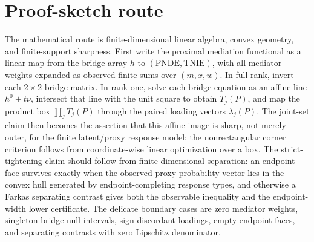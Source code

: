 \documentclass[11pt]{article}
\theoremstyle{definition}
\theoremstyle{plain}
\theoremstyle{remark}
\begin{document}
\section{Proof-sketch route}
The mathematical route is finite-dimensional linear algebra, convex geometry, and finite-support sharpness.  First write the proximal mediation functional as a linear map from the bridge array \(h\) to \((\mathrm{PNDE},\mathrm{TNIE})\), with all mediator weights expanded as observed finite sums over \((m,x,w)\).  In full rank, invert each \(2\times2\) bridge matrix.  In rank one, solve each bridge equation as an affine line \(h^0+t\nu\), intersect that line with the unit square to obtain \(T_j(P)\), and map the product box \(\prod_jT_j(P)\) through the paired loading vectors \(\lambda_j(P)\).  The joint-set claim then becomes the assertion that this affine image is sharp, not merely outer, for the finite latent/proxy response model; the nonrectangular corner criterion follows from coordinate-wise linear optimization over a box.  The strict-tightening claim should follow from finite-dimensional separation: an endpoint face survives exactly when the observed proxy probability vector lies in the convex hull generated by endpoint-completing response types, and otherwise a Farkas separating contrast gives both the observable inequality and the endpoint-width lower certificate.  The delicate boundary cases are zero mediator weights, singleton bridge-null intervals, sign-discordant loadings, empty endpoint faces, and separating contrasts with zero Lipschitz denominator.
\end{document}

